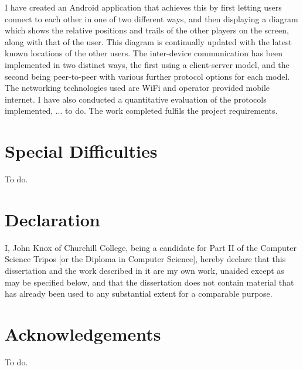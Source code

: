 I have created an Android application that achieves this by first letting users connect to each other in one of two different ways, and then displaying a diagram which shows the relative positions and trails of the other players on the screen, along with that of the user. This diagram is continually updated with the latest known locations of the other users. The inter-device communication has been implemented in two distinct ways, the first using a client-server model, and the second being peer-to-peer with various further protocol options for each model.
The networking technologies used are WiFi and operator provided mobile internet.
I have also conducted a quantitative evaluation of the protocols implemented, ... to do.
The work completed fulfils the project requirements.

\section*{Special Difficulties}

To do.
 
\newpage
\section*{Declaration}

I, John Knox of Churchill College, being a candidate for Part II of the Computer
Science Tripos [or the Diploma in Computer Science], hereby declare
that this dissertation and the work described in it are my own work,
unaided except as may be specified below, and that the dissertation
does not contain material that has already been used to any substantial
extent for a comparable purpose.

\bigskip
{}

\medskip
{}

\cleardoublepage

\tableofcontents


\newpage
\section*{Acknowledgements}

To do.


\cleardoublepage        %

